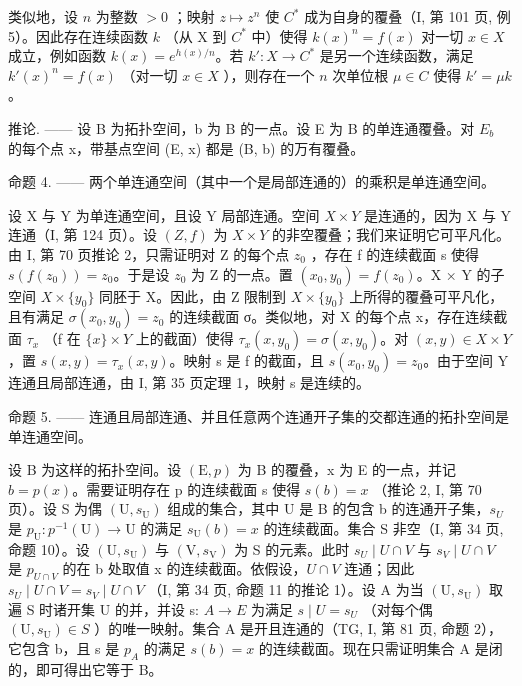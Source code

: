 类似地，设 \(n\) 为整数 \(>0\) ；映射 \(z \mapsto z^{n}\) 使 \(C^{*}\) 成为自身的覆叠（I, 第 101 页, 例 5）。因此存在连续函数 \(k\) （从 X 到 \(C^{*}\) 中）使得 \(k(x)^{n} = f(x)\) 对一切 \(x \in X\) 成立，例如函数 \(k(x) = e^{h(x)/n}\)。若 \(k' : X \to C^{*}\) 是另一个连续函数，满足 \(k'(x)^{n} = f(x)\) （对一切 \(x \in X\) ），则存在一个 \(n\) 次单位根 \(\mu \in C\) 使得 \(k' = \mu k\)。

推论. —— 设 B 为拓扑空间，b 为 B 的一点。设 E 为 B 的单连通覆叠。对 \(E_{b}\) 的每个点 x，带基点空间 (E, x) 都是 (B, b) 的万有覆叠。

命题 4. —— 两个单连通空间（其中一个是局部连通的）的乘积是单连通空间。

设 X 与 Y 为单连通空间，且设 Y 局部连通。空间 \(X \times Y\) 是连通的，因为 X 与 Y 连通（I, 第 124 页）。设 \((Z, f)\) 为 \(X \times Y\) 的非空覆叠；我们来证明它可平凡化。由 I, 第 70 页推论 2，只需证明对 Z 的每个点 \(z_{0}\) ，存在 f 的连续截面 s 使得 \(s(f(z_{0})) = z_{0}\)。于是设 \(z_{0}\) 为 Z 的一点。置 \((x_{0}, y_{0}) = f(z_{0})\)。X × Y 的子空间 \(X \times \{y_{0}\}\) 同胚于 X。因此，由 Z 限制到 \(X \times \{y_{0}\}\) 上所得的覆叠可平凡化，且有满足 \(\sigma(x_{0}, y_{0}) = z_{0}\) 的连续截面 σ。类似地，对 X 的每个点 x，存在连续截面 \(\tau_{x}\) （f 在 \(\{x\} \times Y\) 上的截面）使得 \(\tau_{x}(x, y_{0}) = \sigma(x, y_{0})\)。对 \((x, y) \in X \times Y\) ，置 \(s(x, y) = \tau_{x}(x, y)\)。映射 s 是 f 的截面，且 \(s(x_{0}, y_{0}) = z_{0}\)。由于空间 Y 连通且局部连通，由 I, 第 35 页定理 1，映射 s 是连续的。

命题 5. —— 连通且局部连通、并且任意两个连通开子集的交都连通的拓扑空间是单连通空间。

设 B 为这样的拓扑空间。设 \((\mathrm{E}, p)\) 为 B 的覆叠，x 为 E 的一点，并记 \(b = p(x)\)。需要证明存在 p 的连续截面 s 使得 \(s(b) = x\) （推论 2, I, 第 70 页）。设 S 为偶 \((\mathrm{U}, s_{\mathrm{U}})\) 组成的集合，其中 U 是 B 的包含 b 的连通开子集，\(s_{U}\) 是 \(p_{\mathrm{U}}: p^{-1}(\mathrm{U}) \to \mathrm{U}\) 的满足 \(s_{\mathrm{U}}(b) = x\) 的连续截面。集合 S 非空（I, 第 34 页, 命题 10）。设 \((\mathrm{U}, s_{\mathrm{U}})\) 与 \((\mathrm{V}, s_{\mathrm{V}})\) 为 S 的元素。此时 \(s_{U} \mid U \cap V\) 与 \(s_{V} \mid U \cap V\) 是 \(p_{U \cap V}\) 的在 b 处取值 x 的连续截面。依假设，\(U \cap V\) 连通；因此 \(s_{U} \mid U \cap V = s_{V} \mid U \cap V\) （I, 第 34 页, 命题 11 的推论 1）。设 A 为当 \((\mathrm{U}, s_{\mathrm{U}})\) 取遍 S 时诸开集 U 的并，并设 s: \(A \to E\) 为满足 \(s \mid U = s_{U}\) （对每个偶 \((\mathrm{U}, s_{\mathrm{U}}) \in S\) ）的唯一映射。集合 A 是开且连通的（TG, I, 第 81 页, 命题 2），它包含 b，且 s 是 \(p_{A}\) 的满足 \(s(b) = x\) 的连续截面。现在只需证明集合 A 是闭的，即可得出它等于 B。

